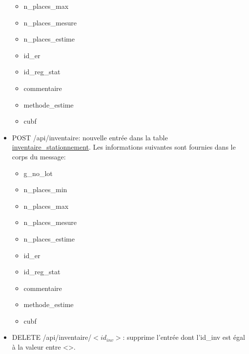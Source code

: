 \begin{itemize}
\begin{itemize}
        \item n\_places\_max
        \item n\_places\_mesure
        \item n\_places\_estime
        \item id\_er
        \item id\_reg\_stat
        \item commentaire
        \item methode\_estime
        \item cubf
    \end{itemize}
    \item POST /api/inventaire: nouvelle entrée dans la table \underline{inventaire\_stationnement}. Les informations suivantes sont fournies dans le corps du message:
    \begin{itemize}
        \item g\_no\_lot
        \item n\_places\_min
        \item n\_places\_max
        \item n\_places\_mesure
        \item n\_places\_estime
        \item id\_er
        \item id\_reg\_stat
        \item commentaire
        \item methode\_estime
        \item cubf
    \end{itemize}
    \item DELETE /api/inventaire/$<id_{inv}>$: supprime l'entrée dont l'id\_inv est égal à la valeur entre <>.
\end{itemize}

